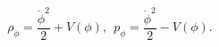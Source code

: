\begin{equation}
\label{3eq3}
\rho_{\phi}=\frac{\dot \phi^2}{2} +V(\phi),~~
p_{\phi}=\frac{\dot \phi^2}{2} -V(\phi).
\end{equation}

